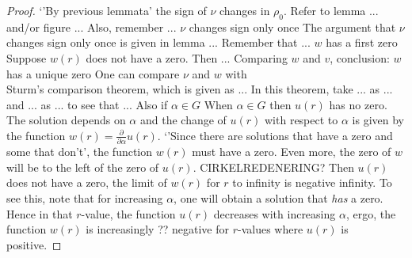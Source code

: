 \begin{lemma}
\begin{proof}
`'By previous lemmata' the sign of $\nu$ changes in $\rho_0$.
Refer to lemma ... and/or figure ...
Also, remember ...
$\nu$ changes sign only once
The argument that $\nu$ changes sign only once is given in lemma ...
Remember that ...
$w$ has a first zero
Suppose $w(r)$ does not have a zero.
Then ...
Comparing $w$ and $v$, conclusion: $w$ has a unique zero
One can compare $\nu$ and $w$ with\\ Sturm's comparison theorem,
which is given as ...
In this theorem, take ... as ... and ... as ... to see that ...
Also if $\alpha\in G$
When $\alpha\in G$ then $u(r)$ has no zero.
The solution depends on $\alpha$ and the change of $u(r)$ with respect to $\alpha$ is given by
the function $w(r)=\frac{\partial}{\partial\alpha}u(r)$.
`'Since there are solutions that have a zero and some that don't',
the function $w(r)$ must have a zero.
Even more, the zero of $w$ will be to the left of the zero of $u(r)$.
CIRKELREDENERING?
Then $u(r)$ does not have a zero, the limit of $w(r)$ for $r$ to infinity is negative infinity.
    To see this, note that for increasing $\alpha$, one will obtain a solution that \emph{has} a zero.
    Hence in that $r$-value, the function $u(r)$ decreases with increasing $\alpha$, ergo,
    the function $w(r)$ is increasingly ?? negative for $r$-values where $u(r)$ is positive.
\end{proof}
\end{lemma}

